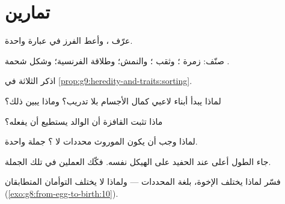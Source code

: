 \section{تمارين}

\begin{exercise}[$\star$]\label{exo:g9:heredity-and-traits:1}
عرّف  ، وأعط  الفرز في عبارة واحدة.
\end{exercise}

\begin{exercise}[$\star$]\label{exo:g9:heredity-and-traits:2}
صنّف: زمرة ؛ وثقب ؛ والنمش؛ وطلاقة الفرنسية؛
وشكل شحمة .
\end{exercise}

\begin{exercise}[$\star$]\label{exo:g9:heredity-and-traits:3}
اذكر  الثلاثة في
\cref{prop:g9:heredity-and-traits:sorting}.
\end{exercise}

\begin{exercise}[$\star$]\label{exo:g9:heredity-and-traits:4}
لماذا يبدأ أبناء لاعبي كمال الأجسام بلا تدريب؟ وماذا
يبين ذلك؟
\end{exercise}

\begin{exercise}[$\star$]\label{exo:g9:heredity-and-traits:5}
ماذا تثبت  القافزة أن الوالد يستطيع أن يفعله؟
\end{exercise}

\begin{exercise}[$\star$]\label{exo:g9:heredity-and-traits:6}
لماذا وجب أن يكون الموروث محددات لا ؟ جملة واحدة.
\end{exercise}

\begin{exercise}[$\star\star$]\label{exo:g9:heredity-and-traits:7}
جاء الطول أعلى عند الحفيد على الهيكل نفسه. فكّك العملين
في تلك الجملة.
\end{exercise}

\begin{exercise}[$\star\star$]\label{exo:g9:heredity-and-traits:8}
فسّر لماذا يختلف الإخوة، بلغة المحددات --- ولماذا لا
يختلف التوأمان المتطابقان
(\cref{exo:g8:from-egg-to-birth:10}).
\end{exercise}

